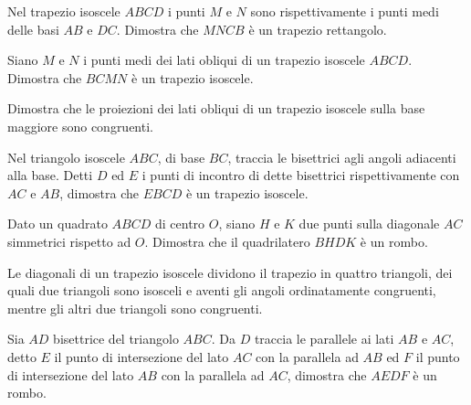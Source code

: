 \begin{multicols}{2}
\begin{esercizio}
\label{ese:4.29}
Nel trapezio isoscele $ABCD$ i punti $M$ e $N$ sono rispettivamente i 
punti medi delle basi $AB$ e $DC$. Dimostra che $MNCB$ è un trapezio 
rettangolo.
\end{esercizio}

\begin{esercizio}
\label{ese:4.30}
Siano $M$ e $N$ i punti medi dei lati obliqui di un trapezio isoscele 
$ABCD$. Dimostra che $BCMN$ è un trapezio isoscele.
\end{esercizio}

\begin{esercizio}
\label{ese:4.32}
Dimostra che le proiezioni dei lati obliqui di un trapezio isoscele 
sulla base maggiore sono congruenti.
\end{esercizio}

\begin{esercizio}
\label{ese:4.33}
Nel triangolo isoscele $ABC$, di base $BC$, traccia le bisettrici 
agli angoli adiacenti alla base. Detti $D$ ed $E$ i punti di incontro 
di dette bisettrici rispettivamente con $AC$ e $AB$, dimostra che 
$EBCD$ è un trapezio isoscele.
\end{esercizio}

\begin{esercizio}
\label{ese:4.41}
Dato un quadrato $ABCD$ di centro $O$, siano $H$ e $K$ due punti 
sulla diagonale $AC$ simmetrici rispetto ad $O$. Dimostra che il 
quadrilatero $BHDK$ è un rombo. 
\end{esercizio}

\begin{esercizio}
\label{ese:4.48}
Le diagonali di un trapezio isoscele dividono il trapezio in quattro 
triangoli, dei quali due triangoli sono isosceli e aventi gli angoli 
ordinatamente congruenti, mentre gli altri due triangoli sono 
congruenti.
\end{esercizio}

\begin{esercizio}
\label{ese:4.59}
Sia $AD$ bisettrice del triangolo $ABC$. Da $D$ traccia le parallele 
ai lati $AB$ e $AC$, detto $E$ il punto di intersezione del lato $AC$ 
con la parallela ad $AB$ ed $F$ il punto di intersezione del lato 
$AB$ con la parallela ad $AC$, dimostra che $AEDF$ è un rombo.
\end{esercizio}

\end{multicols}

